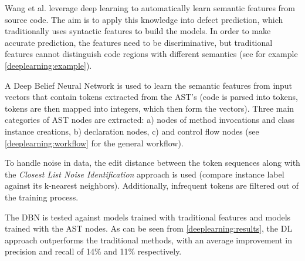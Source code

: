 \documentclass{article}
\begin{document}
 Wang et al. \cite{predict_deeplearning} leverage deep learning to automatically learn semantic features from source code. The aim is to apply this knowledge into defect prediction, which traditionally uses syntactic features to build the models. In order to make accurate prediction, the features need to be discriminative, but traditional features cannot distinguish code regions with different semantics (see for example \cref{deeplearning:example}).

 A Deep Belief Neural Network is used to learn the semantic features from input vectors that contain tokens extracted from the AST's (code is parsed into tokens, tokens are then mapped into integers, which then form the vectors). Three main categories of AST nodes are extracted: a) nodes of method invocations and class instance creations, b) declaration nodes, c) and control flow nodes (see \cref{deeplearning:workflow} for the general workflow).

 To handle noise in data, the edit distance between the token sequences along with the \textit{Closest List Noise Identification} approach is used (compare instance label against its k-nearest neighbors). Additionally, infrequent tokens are filtered out of the training process.

 The DBN is tested against models trained with traditional features and models trained with the AST nodes. As can be seen from \cref{deeplearning:results}, the DL approach outperforms the traditional methods, with an average improvement in precision and recall of 14\% and 11\% respectively.
\end{document}
